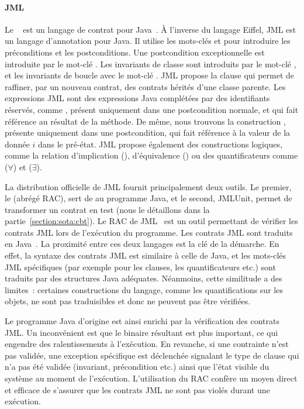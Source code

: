 \paragraph{JML} Le ~ est un langage
de contrat pour Java~. À l'inverse du langage Eiffel, JML est un
langage d'annotation pour Java. Il utilise les mots-clés  et
 pour introduire les préconditions et les postconditions. Une
postcondition exceptionnelle est introduite par le mot-clé . Les
invariants de classe sont introduits par le mot-clé , et les
invariants de boucle avec le mot-clé . JML propose la
clause  qui permet de raffiner, par un nouveau contrat, des contrats
hérités d'une classe parente. Les expressions JML sont des expressions Java
complétées par des identifiants réservés, comme \aresult, présent uniquement
dans une postcondition normale, et qui fait référence au résultat de la méthode.
De même, nous trouvons la construction , présente uniquement dans une
postcondition, qui fait référence à la valeur de la donnée $i$ dans le pré-état.
JML propose également des constructions logiques, comme la relation
d'implication (\code{==>}), d'équivalence (\code{<==>}) ou des quantificateurs
comme  ($\forall$) et  ($\exists$).

La distribution officielle de JML fournit principalement deux outils.  Le
premier, le  (abrégé RAC), sert de
 au programme Java, et le second, JMLUnit, permet de
transformer un contrat en test (nous le détaillons dans la
partie~\ref{section:sota:cbt}). Le RAC de JML~ est un outil
permettant de vérifier les contrats JML lors de l'exécution du programme. Les
contrats JML sont traduits en Java~. La proximité entre ces
deux langages est la clé de la démarche. En effet, la syntaxe des contrats JML
est similaire à celle de Java, et les mots-clés JML spécifiques (par exemple
pour les clauses, les quantificateurs etc.) sont traduits par des structures
Java adéquates.  Néanmoins, cette similitude a des limites~: certaines
constructions du langage, comme les quantifications sur les objets, ne sont pas
traduisibles et donc ne peuvent pas être vérifiées.

Le programme Java d'origine est ainsi enrichi par la vérification des contrats
JML. Un inconvénient est que le binaire résultant est plus important, ce qui
engendre des ralentissements à l'exécution. En revanche, si une contrainte n'est
pas validée, une exception spécifique est déclenchée signalant le type de clause
qui n'a pas été validée (invariant, précondition etc.) ainsi que l'état visible
du système au moment de l'exécution. L'utilisation du RAC confère un moyen
direct et efficace de s'assurer que les contrats JML ne sont pas violés durant
une exécution.

